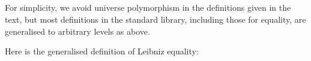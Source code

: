 \begin{fence}
\begin{code}%
\>[0]\AgdaSpace{}%
\AgdaSymbol{:}\AgdaSpace{}%
\AgdaSpace{}%
\AgdaSymbol{\{}\AgdaSpace{}%
\AgdaSymbol{:}\AgdaSpace{}%
\AgdaSymbol{\}}\AgdaSpace{}%
\AgdaSymbol{\{}\AgdaSpace{}%
\AgdaSymbol{:}\AgdaSpace{}%
\AgdaSpace{}%
\AgdaSymbol{\}}\AgdaSpace{}%
\AgdaSymbol{\{}\AgdaSpace{}%
\AgdaSpace{}%
\AgdaSymbol{:}\AgdaSpace{}%
\AgdaSymbol{\}}\<%
\\
\>[0][@{}l@{\AgdaIndent{0}}]%
\>[2]%
\>[732I]\AgdaSpace{}%
\AgdaSpace{}%
\<%
\\
\>[.][@{}l@{}]\<[732I]%
\>[4]\AgdaComment{------}\<%
\\
%
\>[2]\AgdaSpace{}%
\AgdaSpace{}%
\AgdaSpace{}%
\<%
\\
\>[0]\AgdaSpace{}%
\AgdaSpace{}%
\AgdaSymbol{=}\AgdaSpace{}%
\<%
\end{code}
\end{fence}

For simplicity, we avoid universe polymorphism in the definitions given
in the text, but most definitions in the standard library, including
those for equality, are generalised to arbitrary levels as above.

Here is the generalised definition of Leibniz equality:

\begin{fence}
\begin{code}%
\>[0]\AgdaSpace{}%
\AgdaSymbol{:}\AgdaSpace{}%
\AgdaSpace{}%
\AgdaSymbol{\{}\AgdaSpace{}%
\AgdaSymbol{:}\AgdaSpace{}%
\AgdaSymbol{\}}\AgdaSpace{}%
\AgdaSymbol{\{}\AgdaSpace{}%
\AgdaSymbol{:}\AgdaSpace{}%
\AgdaSpace{}%
\AgdaSymbol{\}}\AgdaSpace{}%
\AgdaSymbol{(}\AgdaSpace{}%
\AgdaSpace{}%
\AgdaSymbol{:}\AgdaSpace{}%
\AgdaSymbol{)}\AgdaSpace{}%
\AgdaSpace{}%
\AgdaSpace{}%
\AgdaSymbol{(}\AgdaSpace{}%
\AgdaSymbol{)}\<%
\\
\>[0]\AgdaSpace{}%
\AgdaSymbol{\{}\AgdaSymbol{\}}\AgdaSpace{}%
\AgdaSymbol{\{}\AgdaSymbol{\}}\AgdaSpace{}%
\AgdaSpace{}%
\AgdaSpace{}%
\AgdaSymbol{=}\AgdaSpace{}%
\AgdaSpace{}%
\AgdaSymbol{(}\AgdaSpace{}%
\AgdaSymbol{:}\AgdaSpace{}%
\AgdaSpace{}%
\AgdaSpace{}%
\AgdaSpace{}%
\AgdaSymbol{)}\AgdaSpace{}%
\AgdaSpace{}%
\AgdaSpace{}%
\AgdaSpace{}%
\AgdaSpace{}%
\AgdaSpace{}%
\<%
\end{code}
\end{fence}

